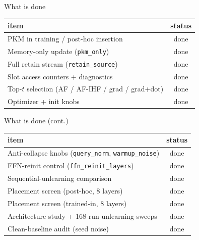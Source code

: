 \documentclass{beamer}
\newcommand{\stdone}{\textcolor{green!50!black}{done}}
\begin{document}
\begin{frame}{What is done}
\begin{center}
\begin{tabular}{|l|c|}
\hline
item & status \\
\hline
PKM in training / post-hoc insertion            & \stdone \\
Memory-only update (\texttt{pkm\_only})          & \stdone \\
Full retain stream (\texttt{retain\_source})     & \stdone \\
Slot access counters + diagnostics               & \stdone \\
Top-$t$ selection (AF / AF-IHF / grad / grad+dot)& \stdone \\
Optimizer + init knobs                           & \stdone \\
\hline
\end{tabular}
\end{center}
\end{frame}

\begin{frame}{What is done (cont.)}
\begin{center}
\begin{tabular}{|l|c|}
\hline
item & status \\
\hline
Anti-collapse knobs (\texttt{query\_norm}, \texttt{warmup\_noise}) & \stdone \\
FFN-reinit control (\texttt{ffn\_reinit\_layers})  & \stdone \\
Sequential-unlearning comparison                  & \stdone \\
Placement screen (post-hoc, 8 layers)            & \stdone \\
Placement screen (trained-in, 8 layers)          & \stdone \\
Architecture study + 168-run unlearning sweeps   & \stdone \\
Clean-baseline audit (seed noise)                & \stdone \\
\hline
\end{tabular}
\end{center}
\end{frame}
\end{document}
